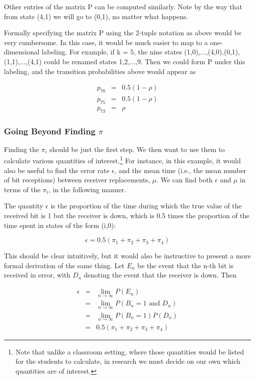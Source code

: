 Other entries of the matrix P can be computed similarly.  Note by the
way that from state (4,1) we will go to (0,1), no matter what happens.

Formally specifying the matrix P using the 2-tuple notation as above
would be very cumbersome.  In this case, it would be much easier to map
to a one-dimensional labeling.  For example, if k = 5, the nine states
(1,0),...,(4,0),(0,1),(1,1),...,(4,1) could be renamed states 1,2,...,9.
Then we could form P under this labeling, and the transition
probabilities above would appear as

\begin{eqnarray}
p_{78} & = & 0.5(1-\rho )\\
p_{75} & = & 0.5(1-\rho )\\
p_{73} & = & \rho 
\end{eqnarray}

\subsubsection{Going Beyond Finding $\pi$}  

Finding the $\pi_{i}$ should be just the first step.  We then want to
use them to calculate various quantities of interest.\footnote{Note that
unlike a classroom setting, where those quantities would be listed for
the students to calculate, in research we must decide on our own which
quantities are of interest.} For instance, in this example, it would
also be useful to find the error rate $\epsilon$, and the mean time
(i.e., the mean number of bit receptions) between receiver replacements,
$\mu$. We can find both $\epsilon$ and $\mu$ in terms of the $\pi_{i}$,
in the following manner.

The quantity $\epsilon$ is the proportion of the time during which the
true value of the received bit is 1 but the receiver is down, which is
0.5 times the proportion of the time spent in states of the form (i,0):

\begin{equation}
\epsilon = 0.5 (\pi_{1}+\pi_{2}+\pi_{3}+\pi _{4})
\end{equation}

This should be clear intuitively, but it would also be instructive to
present a more formal derivation of the same thing.  Let $E_n$ be the
event that the n-th bit is received in error, with $D_n$ denoting the
event that the receiver is down.  Then

\begin{eqnarray}
\label{errorrate} 
\epsilon &=& \lim_{n \rightarrow \infty} P(E_n) \\
&=& \lim_{n \rightarrow \infty} P(B_n = 1 \textrm{ and } D_n) \\
&=& \lim_{n \rightarrow \infty} P(B_n = 1) P(D_n) \\
&=& 0.5 (\pi_{1}+\pi_{2}+\pi_{3}+\pi _{4})
\end{eqnarray}


